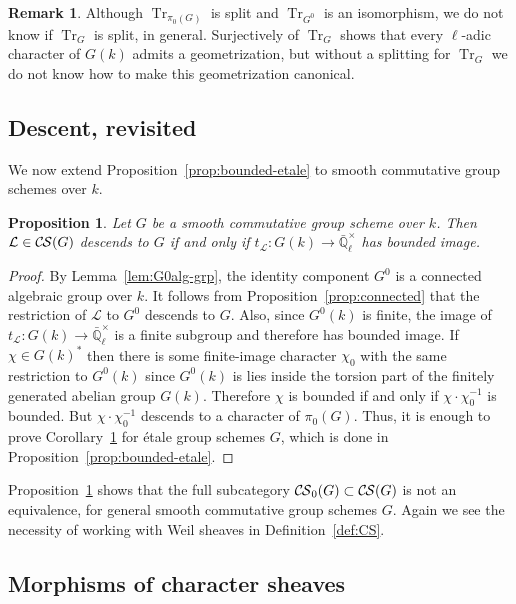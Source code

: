 \documentclass[10pt]{amsart}
\theoremstyle{plain}
\newtheorem{proposition}[theorem]{Proposition}
\theoremstyle{definition}
\newtheorem{remark}[theorem]{Remark}
\newcommand{\EE}{\mathbb{\bar Q}_\ell}
\newcommand{\Fq}{k}
\newcommand{\EEx}{\EE^\times}
\newcommand{\trFrob}[1]{t_{#1}}
\newcommand{\TrFrob}[1]{\operatorname{Tr}_{#1}}
\newcommand{\cs}[1]{{\mathcal{#1}}}
\newcommand{\CS}{{\mathcal{C\hskip-0.8pt S}}}
\newcommand{\bCS}{{\CS_0}}
\begin{document}
\begin{remark}\label{rem:rats}
Although $\TrFrob{\pi_0(G)}$ is split and $\TrFrob{G^0}$ is an isomorphism, we do not know if $\TrFrob{G}$ is split,
in general. Surjectively of $\TrFrob{G}$ shows that every $\ell$-adic character of $G(\Fq)$ admits a geometrization,
but without a splitting for $\TrFrob{G}$ we do not know how to make this geometrization canonical.
\end{remark}


\subsection{Descent, revisited}\label{ssec:revisited}

We now extend Proposition~\ref{prop:bounded-etale} to smooth commutative group schemes over $\Fq$.

\begin{proposition} \label{prop:bounded}
Let $G$ be a smooth commutative group scheme over $\Fq$. 
Then $\cs{L}\in \CS(G)$ descends to $G$ if and only if $\trFrob{\cs{L}} : G(\Fq) \to \EEx$ has bounded image.
\end{proposition}
\begin{proof} 
By Lemma~\ref{lem:G0alg-grp}, the identity component $G^0$ is a connected algebraic group over $\Fq$. 
It follows from Proposition~\ref{prop:connected} that the restriction of $\cs{L}$ to $G^0$ descends to $G$. 
Also, since $G^0(\Fq)$ is finite, the image of $\trFrob{\cs{L}} : G(\Fq) \to \EEx$ is a finite subgroup and therefore has bounded image.  
%
If $\chi \in G(\Fq)^*$ then there is some finite-image character $\chi_0$
with the same restriction to $G^0(\Fq)$ since $G^0(\Fq)$ is lies inside the torsion part of
the finitely generated abelian group $G(\Fq)$.  Therefore $\chi$ is bounded 
if and only if $\chi \cdot \chi_0^{-1}$ is bounded.  But $\chi \cdot \chi_0^{-1}$ descends
to a character of $\pi_0(G)$.
Thus, it is enough to prove Corollary~\ref{prop:bounded}
for \'etale group schemes $G$, which is done in Proposition~\ref{prop:bounded-etale}.
\end{proof}

Proposition~\ref{prop:bounded} shows that the full subcategory
$\bCS(G) \subset \CS(G)$ is not an equivalence, for general smooth commutative group schemes $G$.
Again we see the necessity of working with Weil sheaves in Definition~\ref{def:CS}.

\subsection{Morphisms of character sheaves} \label{ssec:CSmor}
\end{document}
